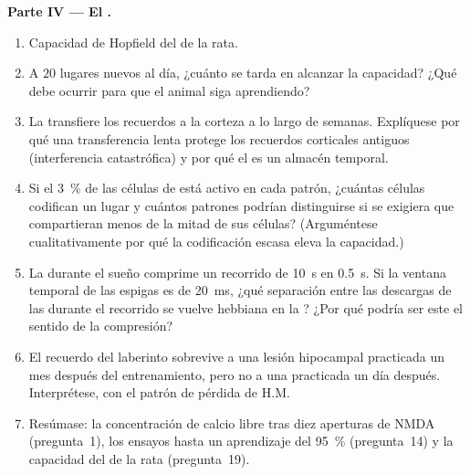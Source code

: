 \begin{problem}
\medskip
\noindent\textbf{Parte IV --- El .}
\begin{enumerate}[resume]
  \item Capacidad de Hopfield del  de la rata.
  \item A $20$ lugares nuevos al día, ¿cuánto se tarda en alcanzar la
        capacidad? ¿Qué debe ocurrir para que el animal siga
        aprendiendo?
  \item La  transfiere los recuerdos a la corteza a lo
        largo de semanas. Explíquese por qué una transferencia lenta
        protege los recuerdos corticales antiguos (interferencia
        catastrófica) y por qué el  es un almacén temporal.
  \item Si el \qty{3}{\%} de las células de  está activo en cada
        patrón, ¿cuántas células codifican un lugar y cuántos patrones
        podrían distinguirse si se exigiera que compartieran menos de
        la mitad de sus células? (Arguméntese cualitativamente por qué
        la codificación escasa eleva la capacidad.)
  \item La  durante el sueño comprime un recorrido de
        \qty{10}{s} en \qty{0.5}{s}. Si la ventana temporal de las
        espigas es de \qty{20}{ms}, ¿qué separación entre las descargas
        de las  durante el recorrido se vuelve hebbiana
        en la ? ¿Por qué podría ser este el sentido de la
        compresión?
  \item El recuerdo del laberinto sobrevive a una lesión hipocampal
        practicada un mes después del entrenamiento, pero no a una
        practicada un día después. Interprétese, con el patrón de
        pérdida de H.M.
  \item Resúmase: la concentración de calcio libre tras diez aperturas
        de NMDA (pregunta~1), los ensayos hasta un aprendizaje del
        \qty{95}{\%} (pregunta~14) y la capacidad del  de la rata
        (pregunta~19).
\end{enumerate}
\end{problem}
